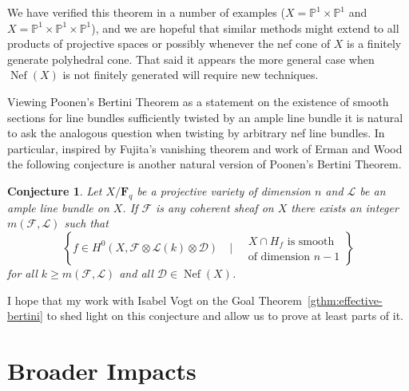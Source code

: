 \documentclass[10pt,reqno]{amsart}
\newtheorem{conj}[lemma]{Conjecture}
\theoremstyle{remark}
\newcommand{\Nef}{\operatorname{Nef}}
\newcommand{\fF}{\mathbf F}
\newcommand{\cD}{\mathcal{D}}
\newcommand{\cF}{\mathcal{F}}
\newcommand{\cL}{\mathcal{L}}
\renewcommand{\P}{\mathbb{P}}
\begin{document}
We have verified this theorem in a number of examples ($X=\P^1\times\P^1$ and $X=\P^1\times\P^1\times\P^1$), and we are hopeful that similar methods might extend to all products of projective spaces or possibly whenever the nef cone of $X$ is a finitely generate polyhedral cone. That said it appears the more general case when $\Nef(X)$ is not finitely generated will require new techniques. 

Viewing Poonen's Bertini Theorem as a statement on the existence of smooth sections for line bundles sufficiently twisted by an ample line bundle it is natural to ask the analogous question when twisting by arbitrary nef line bundles. In particular, inspired by Fujita's vanishing theorem and work of Erman and Wood the following conjecture is another natural version of Poonen's Bertini Theorem. 

 \begin{conj}
 Let $X/\fF_{q}$ be a projective variety of dimension $n$ and $\cL$ be an ample line bundle on $X$. If $\cF$ is any  coherent sheaf on $X$ there exists an integer $m(\cF,\cL)$ such that 
\begin{equation}
\left\{
f \in H^0\left(X, \cF\otimes\cL(k)\otimes \cD\right) \quad \bigg| \quad 
\begin{matrix}
 \text{$X\cap H_{f}$ is smooth}\\
 \text{of dimension $n-1$}
 \end{matrix}
\right\}
\end{equation}
for all $k\geq m(\cF,\cL)$ and all $\cD\in \Nef(X)$. 
 \end{conj}

I hope that my work with Isabel Vogt on the Goal Theorem~\ref{gthm:effective-bertini} to shed light on this conjecture and allow us to prove at least parts of it. 


\section{Broader Impacts}
\end{document}
